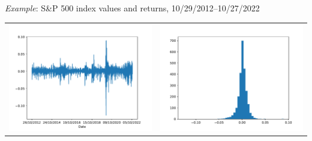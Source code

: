 \begin{frame}
\begin{block}{\emph{Example}: S\&P 500 index values and returns, 10/29/2012--10/27/2022}
\begin{center}
\begin{tabular}{rr}
\includegraphics[height=0.3\textheight]{sp500_return}&\includegraphics[height=0.3\textheight]{sp500_hist}
\end{tabular}
\end{center}
\end{block}
\end{frame}%
